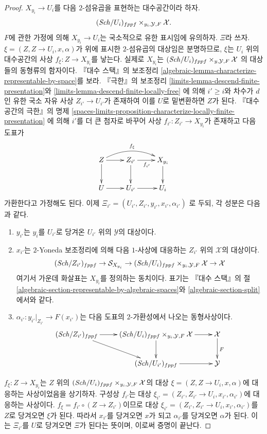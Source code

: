 \begin{proof}
\medskip\noindent
$X_{y_i} \to U_i$를 다음 $2$-섬유곱을 표현하는 대수공간이라 하자.
$$
(\mathit{Sch}/U_i)_{fppf} \times_{y_i, \mathcal{Y}, F} \mathcal{X}.
$$
$F$에 관한 가정에 의해
$X_{y_i} \to U_i$는 국소적으로 유한 표시임에 유의하자.
$\Xi$라 쓰자. $\xi = (Z, Z \to U_i, x, \alpha)$가 위에 표시한
$2$-섬유곱의 대상임은 분명하므로, $\xi$는 $U_i$ 위의 대수공간의 사상
$f_\xi : Z \to X_{y_i}$를 낳는다. 실제로 $X_{y_i}$는
$(\mathit{Sch}/U_i)_{fppf} \times_{y, \mathcal{Y}, F} \mathcal{X}$
의 대상들의 동형류의 함자이다. 『대수 스택』의 보조정리
\ref{algebraic-lemma-characterize-representable-by-space}를 보라.
『극한』의 보조정리 \ref{limits-lemma-descend-finite-presentation}와
\ref{limits-lemma-descend-finite-locally-free}
에 의해 $i' \geq i$와 차수가 $d$인 유한 국소 자유 사상
$Z_{i'} \to U_{i'}$가 존재하여 이를 $U$로 밑변환하면 $Z$가 된다.
『대수 공간의 극한』의 명제
\ref{spaces-limits-proposition-characterize-locally-finite-presentation}
에 의해 $i'$를 더 큰 첨자로 바꾸어 사상
$f_{i'} : Z_{i'} \to X_{y_i}$가 존재하고 다음 도표가
$$
\xymatrix{
Z \ar[d] \ar[r] \ar@/^3ex/[rr]^{f_\xi} &
Z_{i'} \ar[d] \ar[r]_{f_{i'}} & X_{y_i} \ar[d] \\
U \ar[r] & U_{i'} \ar[r] & U_i
}
$$
가환한다고 가정해도 된다. 이제
$\Xi_{i'} = (U_{i'}, Z_{i'}, y_{i'}, x_{i'}, \alpha_{i'})$
로 두되, 각 성분은 다음과 같다.
\begin{enumerate}
\item $y_{i'}$는 $y_i$를 $U_{i'}$로 당겨온
$U_{i'}$ 위의 $\mathcal{Y}$의 대상이다.
\item $x_{i'}$는 $2$-Yoneda 보조정리에 의해 다음 $1$-사상에 대응하는
$Z_{i'}$ 위의 $\mathcal{X}$의 대상이다.
$$
(\mathit{Sch}/Z_{i'})_{fppf} \to
\mathcal{S}_{X_{y_i}} \to
(\mathit{Sch}/U_i)_{fppf} \times_{y_i, \mathcal{Y}, F} \mathcal{X} \to
\mathcal{X}
$$
여기서 가운데 화살표는 $X_{y_i}$를 정의하는 동치이다.
표기는 『대수 스택』의 절
\ref{algebraic-section-representable-by-algebraic-spaces}와
\ref{algebraic-section-split}에서와 같다.
\item $\alpha_{i'} : y_{i'}|_{Z_{i'}} \to F(x_{i'})$는 다음 도표의
$2$-가환성에서 나오는 동형사상이다.
$$
\xymatrix{
(\Sch/Z_{i'})_{fppf} \ar[r] \ar[rd] &
(\Sch/U_i)_{fppf} \times_{y_i, \mathcal{Y}, F} \mathcal{X}
\ar[r] \ar[d] &
\mathcal{X} \ar[d]^F \\
& (\Sch/U_{i'})_{fppf} \ar[r] & \mathcal{Y}
}
$$
\end{enumerate}
$f_\xi : Z \to X_{y_i}$는 $Z$ 위의
$(\mathit{Sch}/U_i)_{fppf} \times_{y_i, \mathcal{Y}, F} \mathcal{X}$의 대상
$\xi = (Z, Z \to U_i, x, \alpha)$에 대응하는 사상이었음을 상기하자.
구성상 $f_{i'}$는 대상
$\xi_{i'} = (Z_{i'}, Z_{i'} \to U_i, x_{i'}, \alpha_{i'})$에 대응하는
사상이다. $f_\xi = f_{i'} \circ (Z \to Z_{i'})$이므로 대상
$\xi_{i'} = (Z_{i'}, Z_{i'} \to U_i, x_{i'}, \alpha_{i'})$를
$Z$로 당겨오면 $\xi$가 된다. 따라서 $x_{i'}$를 당겨오면 $x$가 되고
$\alpha_{i'}$를 당겨오면 $\alpha$가 된다. 이는 $\Xi_{i'}$를
$U$로 당겨오면 $\Xi$가 된다는 뜻이며, 이로써 증명이 끝난다.
\end{proof}










